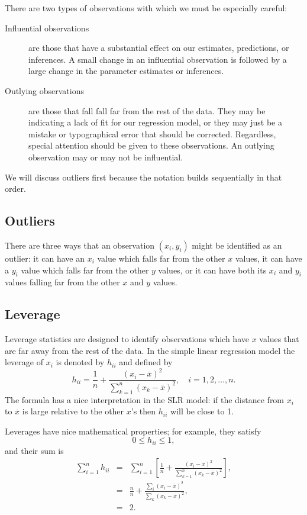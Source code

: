 \documentclass[captions=tableheading]{scrbook}
\begin{document}
There are two types of observations with which we must be especially careful:
\begin{description}
\item[Influential observations] are those that have a substantial effect on our estimates, predictions, or inferences. A small change in an influential observation is followed by a large change in the parameter estimates or inferences.
\item[Outlying observations] are those that fall fall far from the rest of the data. They may be indicating a lack of fit for our regression model, or they may just be a mistake or typographical error that should be corrected. Regardless, special attention should be given to these observations. An outlying observation may or may not be influential.
\end{description}

We will discuss outliers first because the notation builds sequentially in that order.
\subsection{Outliers}
\label{sec-11-5-1}

There are three ways that an observation \((x_{i},y_{i})\) might be identified as an  outlier: it can have an \(x_{i}\) value which falls far from the other  \(x\) values, it can have a \(y_{i}\) value which falls far from the other \(y\) values, or it can have both its \(x_{i}\) and \(y_{i}\) values falling far from the other \(x\) and \(y\) values.
\subsection{Leverage}
\label{sec-11-5-2}

Leverage statistics are designed to identify observations which have \(x\) values that are far away from the rest of the data. In the simple linear regression model the leverage of \(x_{i}\) is denoted by \(h_{ii}\) and defined by 
\begin{equation}
h_{ii}=\frac{1}{n}+\frac{(x_{i}-\overline{x})^{2}}{\sum_{k=1}^{n}(x_{k}-\overline{x})^{2}},\quad i=1,2,\ldots,n.
\end{equation}
The formula has a nice interpretation in the SLR model: if the distance from \(x_{i}\) to \(\overline{x}\) is large relative to the other \(x\)'s then \(h_{ii}\) will be close to 1. 

Leverages have nice mathematical properties; for example, they satisfy
\begin{equation}
0\leq h_{ii}\leq1,\label{eq:slr-leverage-between}
\end{equation}
and their sum is
\begin{eqnarray}
\sum_{i=1}^{n}h_{ii} & = & \sum_{i=1}^{n}\left[\frac{1}{n}+\frac{(x_{i}-\overline{x})^{2}}{\sum_{k=1}^{n}(x_{k}-\overline{x})^{2}}\right],\\
 & = & \frac{n}{n}+\frac{\sum_{i}(x_{i}-\overline{x})^{2}}{\sum_{k}(x_{k}-\overline{x})^{2}},\\
 & = & 2.\label{eq:slr-average-leverage}
\end{eqnarray}
\end{document}
